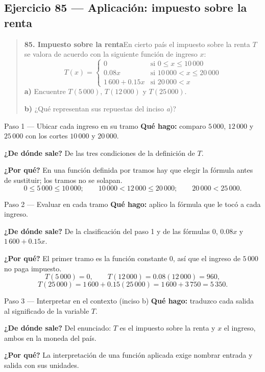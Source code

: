 \documentclass[11pt]{article}
\begin{document}
\subsection*{Ejercicio 85 — Aplicación: impuesto sobre la renta}

\begin{quote}
\textbf{85. Impuesto sobre la renta}\quad En cierto país el impuesto sobre la renta $T$ se valora de acuerdo con la siguiente función de ingreso $x$:
\[
T(x)=\begin{cases}
0 & \text{si } 0\le x\le 10\,000\\
0.08x & \text{si } 10\,000< x\le 20\,000\\
1\,600+0.15x & \text{si } 20\,000<x
\end{cases}
\]
\textbf{a)} Encuentre $T(5\,000)$, $T(12\,000)$ y $T(25\,000)$.

\textbf{b)} ¿Qué representan sus repuestas del inciso \emph{a})?
\end{quote}

\begin{paso}{Paso 1 --- Ubicar cada ingreso en su tramo}
\textbf{Qué hago:} comparo $5\,000$, $12\,000$ y $25\,000$ con los cortes $10\,000$ y $20\,000$.

\textbf{¿De dónde sale?} De las tres condiciones de la definición de $T$.

\textbf{¿Por qué?} En una función definida por tramos hay que elegir la fórmula antes de sustituir; los tramos no se solapan.
\[
0\le5\,000\le10\,000;\qquad 10\,000<12\,000\le20\,000;\qquad 20\,000<25\,000.
\]
\end{paso}

\begin{paso}{Paso 2 --- Evaluar en cada tramo}
\textbf{Qué hago:} aplico la fórmula que le tocó a cada ingreso.

\textbf{¿De dónde sale?} De la clasificación del paso 1 y de las fórmulas $0$, $0.08x$ y $1\,600+0.15x$.

\textbf{¿Por qué?} El primer tramo es la función constante 0, así que el ingreso de $5\,000$ no paga impuesto.
\[
T(5\,000)=0,\qquad T(12\,000)=0.08(12\,000)=960,
\]
\[
T(25\,000)=1\,600+0.15(25\,000)=1\,600+3\,750=5\,350.
\]
\end{paso}

\begin{paso}{Paso 3 --- Interpretar en el contexto (inciso b)}
\textbf{Qué hago:} traduzco cada salida al significado de la variable $T$.

\textbf{¿De dónde sale?} Del enunciado: $T$ es el impuesto sobre la renta y $x$ el ingreso, ambos en la moneda del país.

\textbf{¿Por qué?} La interpretación de una función aplicada exige nombrar entrada y salida con sus unidades.
\end{paso}
\end{document}
